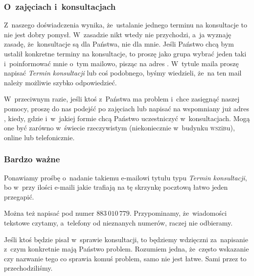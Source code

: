 \documentclass[10pt,t]{beamer}
\begin{document}
\begin{frame}
  \frametitle{O~zajęciach i~konsultacjach}


  Z~naszego doświadczenia wynika, że~ustalanie jednego terminu na
  konsultacje to nie jest dobry pomysł. W~zasadzie nikt wtedy nie
  przychodzi, a~ja wyznaję zasadę, że~konsultacje są dla Państwa, nie dla
  mnie. Jeśli Państwo chcą bym ustalił konkretne terminy na konsultacje, to
  proszę jako grupa wybrać jeden taki i~poinformować mnie o~tym mailowo,
  pisząc na adres \email. W~tytule maila proszę napisać \textit{Termin
    konsultacji} lub coś podobnego, byśmy wiedzieli, że~na ten mail należy
  możliwie szybko odpowiedzieć.

  W~przeciwnym razie, jeśli ktoś z~Państwa ma problem i~chce zasięgnąć
  naszej pomocy, proszę do nas podejść po zajęciach lub napisać na
  wspomniany już adres \email, kiedy, gdzie i~w~jakiej formie chcą Państwo
  uczestniczyć w~konsultacjach. Mogą one być zarówno w~świecie rzeczywistym
  (niekoniecznie w~budynku \textsc{wsz}i\textsc{b}u), online lub
  telefonicznie.

\end{frame}





\begin{frame}
  \frametitle{Bardzo ważne}


  Ponawiamy prośbę o~nadanie takiemu e-mailowi tytułu typu \textit{Termin
    konsultacji}, bo w~przy ilości e-maili jakie trafiają na tę skrzynkę
  pocztową łatwo jeden przegapić.

  Można też napisać pod numer $883 \, 010 \, 779$. Przypominamy,
  że~wiadomości tekstowe czytamy, a~telefony od nieznanych numerów, raczej
  nie odbieramy.

  Jeśli ktoś będzie pisał w~sprawie konsultacji, to będziemy wdzięczni
  za~napisanie z~czym konkretnie mają Państwo problem. Rozumiem jedna,
  że~często wskazanie czy nazwanie tego co sprawia komuś problem, samo nie
  jest łatwe. Sami przez to przechodziliśmy.

\end{frame}











\printbibliography





\end{document}
